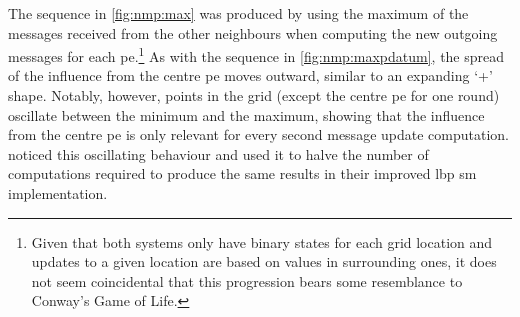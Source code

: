 The sequence in \cref{fig:nmp:max} was produced by using the maximum of the messages received from the other neighbours when computing the new outgoing messages for each \gls{pe}.\footnote{Given that both systems only have binary states for each grid location and updates to a given location are based on values in surrounding ones, it does not seem coincidental that this progression bears some resemblance to Conway's Game of Life.}  As with the sequence in \cref{fig:nmp:maxpdatum}, the spread of the influence from the centre \gls{pe} moves outward, similar to an expanding `+' shape.  Notably, however, points in the grid (except the centre \gls{pe} for one round) oscillate between the minimum and the maximum, showing that the influence from the centre \gls{pe} is only relevant for every second message update computation.  \citeauthor{Felzenszwalb2006} \cite{Felzenszwalb2006} noticed this oscillating behaviour and used it to halve the number of computations required to produce the same results in their improved \gls{lbp} \gls{sm} implementation.

